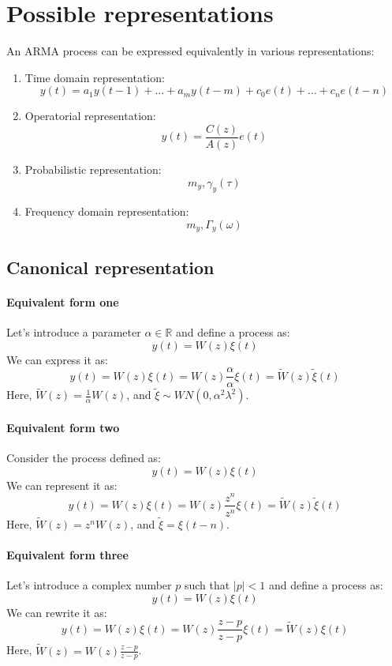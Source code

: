 \section{Possible representations}

An ARMA process can be expressed equivalently in various representations:
\begin{enumerate}
    \item Time domain representation: 
        \[y(t)=a_1y(t-1)+\dots+a_m y(t-m)+c_0e(t)+\dots+c_n e(t-n) \]
    \item Operatorial representation: 
        \[y(t)=\dfrac{C(z)}{A(z)}e(t)\]
    \item Probabilistic representation: 
        \[m_y,\gamma_y(\tau)\]
    \item Frequency domain representation: 
        \[m_y,\Gamma_y(\omega)\]
\end{enumerate}

\subsection{Canonical representation}
\paragraph*{Equivalent form one}
Let's introduce a parameter $\alpha \in \mathbb{R}$ and define a process as:
\[y(t)=W(z)\xi(t)\]
We can express it as:
\[y(t)=W(z)\xi(t)=W(z)\dfrac{\alpha}{\alpha}\xi(t)=\tilde{W}(z)\tilde{\xi}(t)\]
Here, $\tilde{W}(z)=\frac{1}{\alpha}W(z)$, and $\tilde{\xi}\sim WN(0,\alpha^2\lambda^2)$. 

\paragraph*{Equivalent form two}
Consider the process defined as:
\[y(t)=W(z)\xi(t)\]
We can represent it as:
\[y(t)=W(z)\xi(t)=W(z)\dfrac{z^n}{z^n}\xi(t)=\tilde{W}(z)\tilde{\xi}(t)\]
Here, $\tilde{W}(z)=z^n W(z)$, and $\tilde{\xi}=\xi(t-n)$. 

\paragraph*{Equivalent form three}
Let's introduce a complex number $p$ such that $\left\lvert p \right\rvert < 1$ and define a process as:
\[y(t)=W(z)\xi(t)\]
We can rewrite it as:
\[y(t)=W(z)\xi(t)=W(z)\dfrac{z-p}{z-p}\xi(t)=\tilde{W}(z)\xi(t)\]
Here, $\tilde{W}(z)=W(z)\frac{z-p}{z-p}$. 


